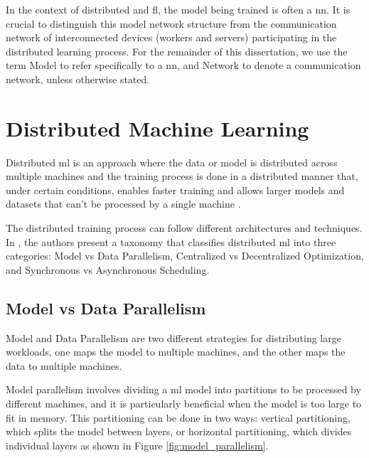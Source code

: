 In the context of distributed and \ac{fl}, the model being trained is often a \ac{nn}. It is crucial to distinguish this model network structure from the communication network of interconnected devices (workers and servers) participating in the distributed learning process. For the remainder of this dissertation, we use the term Model to refer specifically to a \ac{nn}, and Network to denote a communication network, unless otherwise stated.



\section{Distributed Machine Learning}
\label{sec:distributed-ml}

Distributed \ac{ml} is an approach where the data or model is distributed across multiple machines and the training process is done in a distributed manner that, under certain conditions, enables faster training and allows larger models and datasets that can't be processed by a single machine \cite{10410765, 10608461}. 

The distributed training process can follow different architectures and techniques. In \cite{9120226}, the authors present a taxonomy that classifies distributed \ac{ml} into three categories: Model vs Data Parallelism, Centralized vs Decentralized Optimization, and Synchronous vs Asynchronous Scheduling.

\subsection{Model vs Data Parallelism}
\label{sec:model-vs-data-parallelism}

Model and Data Parallelism are two different strategies for distributing large workloads, one maps the model to multiple machines, and the other maps the data to multiple machines.

Model parallelism involves dividing a \ac{ml} model into partitions to be processed by different machines, and it is particularly beneficial when the model is too large to fit in memory. This partitioning can be done in two ways: vertical partitioning, which splits the model between layers, or horizontal partitioning, which divides individual layers as shown in Figure \ref{fig:model_parallelism}.

